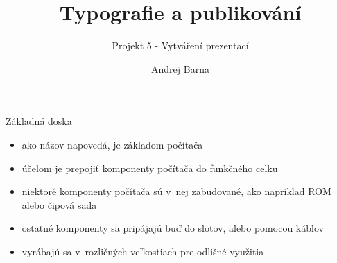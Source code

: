 \documentclass[pdf,fyma]{prosper}
\title{Typografie a publikování}
\subtitle{Projekt 5 - Vytváření prezentací}
\author{Andrej Barna}
\begin{document}
\maketitle

\begin{slide}{Základná doska}
\begin{itemize}
\item ako názov napovedá, je základom počítača 
\item účelom je prepojiť komponenty počítača do funkčného celku
\item niektoré komponenty počítača sú v~nej zabudované, ako napríklad ROM alebo čipová sada
\item ostatné komponenty sa pripájajú buď do slotov, alebo pomocou káblov
\item vyrábajú sa v~rozličných veľkostiach pre odlišné využitia
\end{itemize}
\begin{figure}[ht]
  \begin{center}
  \label{motherboard}
  \end{center}
\end{figure}
\end{slide}
\end{document}
